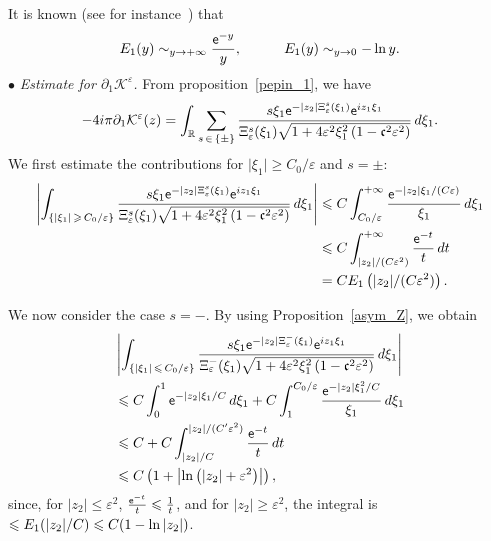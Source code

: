 \documentclass[AHL,Unicode,longabstracts,published]{cedram}
\newcommand*\p{\partial}
\newcommand*\R{\mathbb R}
\newcommand*\BK{\mathcal{K}}
\newcommand*\ex{{\sf e}}
\newcommand*\cs{{\mathfrak c}}
\newcommand*\ii{\infty}
\newcommand*\gs{\geqslant }
\newcommand*\ls{\leqslant }
\newcommand*\e{\varepsilon}
\begin{document}
It is known (see for instance~\cite{Abr-Steg}) that
\begin{equation}\label{asymp_E1}
E_1 (y) \sim_{y \to +\ii} \frac{\ex^{-y}}{y},
\quad \quad \quad E_1 (y) \sim_{y \to 0} - \ln y.
\end{equation}
$ \bullet $ \emph{Estimate for $ \p_1 \BK^\e $.} From proposition~\ref{pepin_1}, we have
\[
- 4 i \pi \p_1 \BK^\e (z) =
\int_{\R} \sum_{s\,\in\,\{ \pm \} } \frac{ s \xi_1 \ex^{- |z_2| \Xi_\e^s (\xi_1)} \ex^{i z_1 \xi_1} }{\Xi_\e^s (\xi_1)
\sqrt{1 + 4\e^2 \xi_1^2\left(1 - \cs^2 \e^2\right)}} \, d\xi_1.
\]
We first estimate the contributions for $ \lvert \xi_1 \rvert \gs C_0 / \e $ and $ s = \pm $:
\begin{align*}
\left\lvert \int_{\left\{\left\lvert \xi_1 \right\rvert\,\gs\,C_0/ \e \right\}}
\frac{ s \xi_1 \ex^{- |z_2| \Xi_\e^s (\xi_1)} \ex^{i z_1 \xi_1} }{\Xi_\e^s (\xi_1)
\sqrt{1 + 4\e^2 \xi_1^2 \left(1 - \cs^2 \e^2\right)}} \, d\xi_1 \right\rvert &\ls C \int_{C_0 / \e }^{+\ii} \frac{\ex^{- |z_2| \xi_1 / (C \e) }}{ \xi_1 } \, d\xi_1
\\&
\ls C \int_{|z_2|/(C\e^2)}^{+\ii} \frac{\ex^{-t}}{t} \, d t
\\& = C E_1 \left(|z_2|/ (C\e^2) \right).
\end{align*}

We now consider the case $ s= - $. By using Proposition~\ref{asym_Z}, we obtain
\begin{multline*}
\left\lvert \int_{\left\{\lvert \xi_1 \rvert \,\ls\,C_0 / \e \right\}}
\frac{ s \xi_1 \ex^{- |z_2| \Xi_\e^- (\xi_1)} \ex^{i z_1 \xi_1} }{\Xi_\e^- (\xi_1)
\sqrt{1 + 4\e^2 \xi_1^2\left(1 - \cs^2 \e^2\right)}} \, d\xi_1 \right\rvert
\\
\begin{aligned}
&\ls C \int_{0}^{1} \ex^{- |z_2| \xi_1 / C} \, d \xi_1 + C \int_{1}^{C_0/ \e} \frac{\ex^{- |z_2| \xi_1^2 /C}}{ \xi_1 } \, d \xi_1
\\ &
\ls C + C \int_{|z_2|/C}^{|z_2|/(C'\e^2)} \frac{\ex^{-t}}{t} \, d t
\\ &
\ls C \left(1 + \left\lvert \ln \left(|z_2| +\e^2\right) \right\rvert\right),
\end{aligned}
\end{multline*}
since, for $ |z_2| \ls \e^2 $, $ \frac{\ex^{-t}}{t} \ls \frac{1}{t} $, and for $ | z_2| \gs \e^2 $, the integral is $ \ls E_1 (|z_2|/C)\linebreak\ls C (1 - \ln |z_2|) $.
\end{document}
